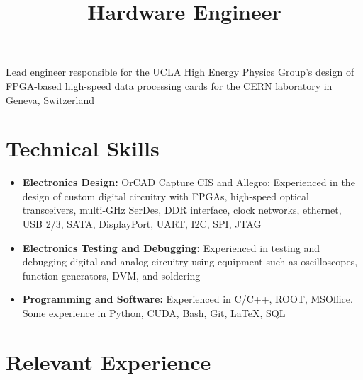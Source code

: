 \documentclass[10pt,a4paper,sans]{moderncv}        %
\title{Hardware Engineer}                               %
\begin{document}
\makecvtitle

\small{Lead engineer responsible for the UCLA High Energy Physics Group's design of FPGA-based high-speed data processing cards for the CERN laboratory in Geneva, Switzerland}\\

\section{Technical Skills}

\vspace{6pt}

\begin{itemize}

\item \textbf{Electronics Design:} OrCAD Capture CIS and Allegro; Experienced in the design of custom digital circuitry with FPGAs, high-speed optical transceivers, multi-GHz SerDes, DDR interface, clock networks, ethernet, USB 2/3, SATA, DisplayPort, UART, I2C, SPI, JTAG
\vspace{6pt}

\item \textbf{Electronics Testing and Debugging:} Experienced in testing and debugging digital and analog circuitry using equipment such as oscilloscopes, function generators, DVM, and soldering
\vspace{6pt}

\item \textbf{Programming and Software:} Experienced in C/C++, ROOT, MSOffice. Some experience in Python, CUDA, Bash, Git, LaTeX, SQL
\vspace{6pt}

\end{itemize}

\section{Relevant Experience}

\vspace{6pt}
\end{document}
